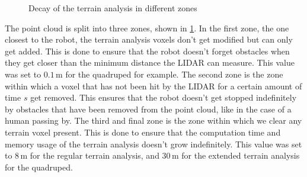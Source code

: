 \documentclass[12pt]{article}
\begin{document}
        \begin{figure}[H]
            \centering
            \caption{Decay of the terrain analysis in different zones}
            \label{fig:decay}
        \end{figure}

        The point cloud is split into three zones, shown in \ref{fig:decay}. In the first zone, the one closest to the robot, the terrain analysis voxels don't get modified but can only get added. This is done to ensure that the robot doesn't forget obstacles when they get closer than the minimum distance the LIDAR can measure. This value was set to $0.1\,\text{m}$ for the quadruped for example.
        The second zone is the zone within which a voxel that has not been hit by the LIDAR for a certain amount of time $s$ get removed. This ensures that the robot doesn't get stopped indefinitely by obstacles that have been removed from the point cloud, like in the case of a human passing by. The third and final zone is the zone within which we clear any terrain voxel present. This is done to ensure that the computation time and memory usage of the terrain analysis doesn't grow indefinitely. This value was set to $8\,\text{m}$ for the regular terrain analysis, and $30\,\text{m}$ for the extended terrain analysis for the quadruped.
        
\end{document}
